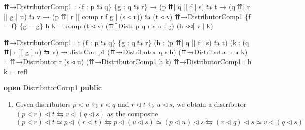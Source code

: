 \documentclass[
  11pt,
  oneside,
  article]{memoir}
\newenvironment{Shaded}{}{}
\newcommand{\KeywordTok}[1]{\textcolor[rgb]{0.00,0.44,0.13}{\textbf{#1}}}
\newcommand{\NormalTok}[1]{#1}
\newcommand{\OtherTok}[1]{\textcolor[rgb]{0.00,0.44,0.13}{#1}}
\providecommand{\tightlist}{%
  \setlength{\itemsep}{0pt}\setlength{\parskip}{0pt}}
\theoremstyle{definition}
\theoremstyle{plain}
\newcommand{\0}{\textsf{0}}
\newcommand{\1}{\tn{\textsf{1}}}
\begin{document}
\begin{Shaded}
\begin{Highlighting}[]
\NormalTok{    ⇈→DistributorComp1 }\OtherTok{:} \OtherTok{\{}\NormalTok{f }\OtherTok{:}\NormalTok{ p ⇆ q}\OtherTok{\}} \OtherTok{\{}\NormalTok{g }\OtherTok{:}\NormalTok{ q ⇆ r}\OtherTok{\}} 
                         \OtherTok{→} \OtherTok{(}\NormalTok{p ⇈[ q ][ f ] s}\OtherTok{)}\NormalTok{ ⇆ t }
                         \OtherTok{→} \OtherTok{(}\NormalTok{q ⇈[ r ][ g ] u}\OtherTok{)}\NormalTok{ ⇆ v}
                         \OtherTok{→} \OtherTok{(}\NormalTok{p ⇈[ r ][ comp r f g ] }\OtherTok{(}\NormalTok{s ◃ u}\OtherTok{))}\NormalTok{ ⇆ }\OtherTok{(}\NormalTok{t ◃ v}\OtherTok{)}
\NormalTok{    ⇈→DistributorComp1 }\OtherTok{\{}\NormalTok{f }\OtherTok{=}\NormalTok{ f}\OtherTok{\}} \OtherTok{\{}\NormalTok{g }\OtherTok{=}\NormalTok{ g}\OtherTok{\}}\NormalTok{ h k }\OtherTok{=} 
\NormalTok{        comp }\OtherTok{(}\NormalTok{t ◃ v}\OtherTok{)} \OtherTok{(}\NormalTok{⇈[]Distr p q r s u f g}\OtherTok{)} 
             \OtherTok{(}\NormalTok{h ◃◃[ v ] k}\OtherTok{)}

\NormalTok{    ⇈→DistributorComp1≡ }\OtherTok{:} \OtherTok{\{}\NormalTok{f }\OtherTok{:}\NormalTok{ p ⇆ q}\OtherTok{\}} \OtherTok{\{}\NormalTok{g }\OtherTok{:}\NormalTok{ q ⇆ r}\OtherTok{\}} 
                          \OtherTok{(}\NormalTok{h }\OtherTok{:} \OtherTok{(}\NormalTok{p ⇈[ q ][ f ] s}\OtherTok{)}\NormalTok{ ⇆ t}\OtherTok{)}
                          \OtherTok{(}\NormalTok{k }\OtherTok{:} \OtherTok{(}\NormalTok{q ⇈[ r ][ g ] u}\OtherTok{)}\NormalTok{ ⇆ v}\OtherTok{)}
                          \OtherTok{→}\NormalTok{ distrComp1 }\OtherTok{(}\NormalTok{⇈→Distributor q s h}\OtherTok{)} \OtherTok{(}\NormalTok{⇈→Distributor r u k}\OtherTok{)}
\NormalTok{                            ≡ ⇈→Distributor r }\OtherTok{(}\NormalTok{s ◃ u}\OtherTok{)} \OtherTok{(}\NormalTok{⇈→DistributorComp1 h k}\OtherTok{)}
\NormalTok{    ⇈→DistributorComp1≡ h k }\OtherTok{=}\NormalTok{ refl}
    
\KeywordTok{open}\NormalTok{ DistributorComp1 }\KeywordTok{public}
\end{Highlighting}
\end{Shaded}

\begin{enumerate}
\def\labelenumi{\arabic{enumi}.}
\setcounter{enumi}{1}
\tightlist
\item
  Given distributors
  \(p \triangleleft u \leftrightarrows v \triangleleft q\) and
  \(r \triangleleft t \leftrightarrows u \triangleleft s\), we obtain a
  distributor
  \((p \triangleleft r) \triangleleft t \leftrightarrows v \triangleleft (q \triangleleft s)\)
  as the composite \[
  (p \triangleleft r) \triangleleft t \simeq p \triangleleft (r \triangleleft t) \leftrightarrows p \triangleleft (u \triangleleft s) \simeq (p \triangleleft u) \triangleleft s \leftrightarrows (v \triangleleft q) \triangleleft s \simeq v \triangleleft (q \triangleleft s)
  \]
\end{enumerate}

\makeatletter
{}
\makeatother
\end{document}
